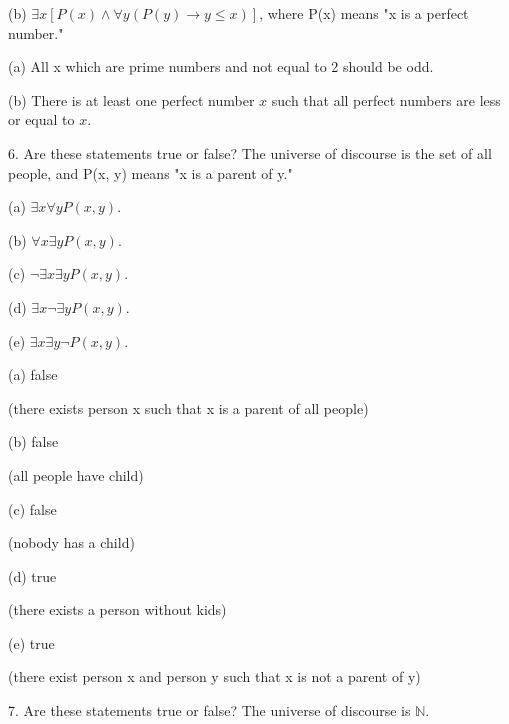 \documentclass{article}
\begin{document}
\hspace{12pt}(b) $\exists x[P(x) \land \forall y(P(y) \to y \leq x)]$, where P(x) means "x is a perfect
number."
\vspace{30pt}

(a) All x which are prime numbers and not equal to 2 should be odd.
\vspace{20pt}

(b) There is at least one perfect number $x$ such that all perfect numbers are less or equal to $x$.

\vspace{30pt}

6. Are these statements true or false? The universe of discourse is the set of
all people, and P(x, y) means "x is a parent of y."

\hspace{12pt}(a) $\exists x \forall y P(x, y)$.

\hspace{12pt}(b) $\forall x \exists y P(x, y)$.

\hspace{12pt}(c) $\neg \exists x \exists y P(x, y)$.

\hspace{12pt}(d) $\exists x \neg \exists y P(x, y)$.

\hspace{12pt}(e) $\exists x \exists y \neg P(x, y)$.

\vspace{30pt}

(a) false

(there exists person x such that x is a parent of all people)
\vspace{30pt}

(b) false

(all people have child)
\vspace{30pt}

(c) false

(nobody has a child)
\vspace{30pt}

(d) true

(there exists a person without kids)
\vspace{30pt}

(e) true

(there exist person x and person y such that x is not a parent of y)

\vspace{30pt}

7. Are these statements true or false? The universe of discourse is $\mathbb{N}$.
\end{document}
